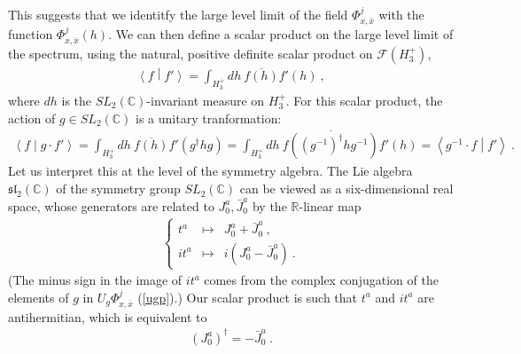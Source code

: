 \documentclass[12pt,a4paper,notitlepage]{report}
\newcommand \R {\mathbb{R}}
\newcommand \C {\mathbb{C}}
\numberwithin{equation}{section}
\theoremstyle{break}
\begin{document}
This suggests that we identitfy the large level limit of the field $\Phi^j_{x,\bar{x}}$ with the function $\Phi^j_{x,\bar{x}}(h)$. 
We can then define a scalar product on the large level limit of the spectrum, using the natural, positive definite scalar product on $\mathcal{F}(H_3^+)$, 
\begin{align}
 \left\langle f \middle| f' \right\rangle = \int_{H_3^+} dh\ \overline{f(h)} f'(h)\ ,
\end{align}
where $dh$ is the $SL_2(\C)$-invariant measure on $H_3^+$. For this scalar product, the action of $g\in SL_2(\C)$ is a unitary tranformation:
\begin{align}
 \left\langle f \middle| g\cdot f'\right\rangle = \int_{H_3^+}dh\ \overline{f(h)} f'(g^\dagger h g) = \int_{H_3^+}dh\ \overline{f((g^{-1})^\dagger h g^{-1})} f'(h) = \left\langle g^{-1}\cdot f \middle| f'\right\rangle\ .
\end{align}
Let us interpret this at the level of the symmetry algebra. The Lie algebra $\mathfrak{sl}_2(\C)$ of the symmetry group $SL_2(\C)$ can be viewed as a six-dimensional real space, whose generators are related to $J^a_0, \bar{J}^a_0$ by the $\R$-linear map
\begin{align}
 \left\{\begin{array}{lcl} t^a & \mapsto & J_0^a + \bar{J}_0^a \ ,  \\ it^a & \mapsto & i(J^a_0 - \bar{J}^a_0)\ . \end{array}\right. 
\end{align}
(The minus sign in the image of $it^a$ comes from the complex conjugation of the elements of $g$ in $U_g\Phi^j_{x,\bar{x}}$ (\ref{ugp}).)
Our scalar product is such that $t^a$ and $it^a$ are antihermitian, which is equivalent to
\begin{align}
 (J^a_0)^\dagger = -\bar{J}^a_0\ .
\label{jzd}
\end{align}
\end{document}
